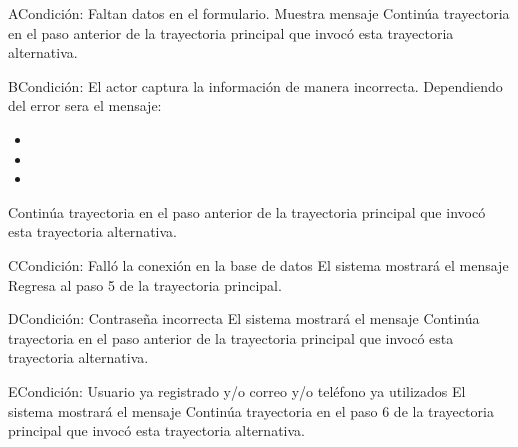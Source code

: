 	\begin{UCtrayectoriaA}{A}{Condición: Faltan datos en el formulario.}
		\UCpaso[\UCsist] Muestra mensaje 
		\UCpaso[\UCsist] Continúa trayectoria en el paso anterior de la trayectoria  principal que invocó esta trayectoria alternativa. 
	\end{UCtrayectoriaA}
	\begin{UCtrayectoriaA}{B}{Condición: El actor captura la información de manera incorrecta.}
		\UCpaso[\UCsist] Dependiendo del error sera el mensaje:
			\begin{itemize}
			\item {}
			\item {}
			\item {}
			\end{itemize}
		\UCpaso[\UCsist] Continúa trayectoria en el paso anterior de la trayectoria principal que invocó esta trayectoria alternativa. 
	\end{UCtrayectoriaA}
	\begin{UCtrayectoriaA}{C}{Condición: Falló la conexión en la base de datos}
		\UCpaso[\UCsist] El sistema mostrará el mensaje 
		\UCpaso[\UCsist] Regresa al paso 5 de la trayectoria principal. 
	\end{UCtrayectoriaA}
	\begin{UCtrayectoriaA}{D}{Condición: Contraseña incorrecta}
		\UCpaso[\UCsist] El sistema mostrará el mensaje 
		\UCpaso[\UCsist] Continúa trayectoria en el paso anterior de la trayectoria  principal que invocó esta trayectoria alternativa. 
	\end{UCtrayectoriaA}
	\begin{UCtrayectoriaA}{E}{Condición: Usuario ya registrado y/o correo y/o teléfono ya utilizados}
		\UCpaso[\UCsist] El sistema mostrará el mensaje 
		\UCpaso[\UCsist] Continúa trayectoria en el paso 6 de la trayectoria  principal que invocó esta trayectoria alternativa. 
	\end{UCtrayectoriaA}
